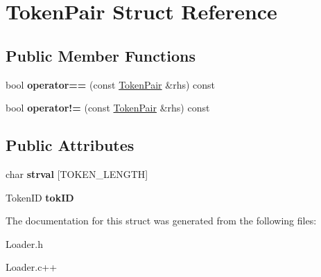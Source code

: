 \hypertarget{structTokenPair}{\section{Token\-Pair Struct Reference}
\label{structTokenPair}
}
\subsection*{Public Member Functions}
\begin{DoxyCompactItemize}
\item 
\hypertarget{structTokenPair_aa945304b4393a2ea9380c248318b87ce}{bool {\bfseries operator==} (const \hyperlink{structTokenPair}{Token\-Pair} \&rhs) const }\label{structTokenPair_aa945304b4393a2ea9380c248318b87ce}

\item 
\hypertarget{structTokenPair_ab1f679211334843c340a7b3cada94c43}{bool {\bfseries operator!=} (const \hyperlink{structTokenPair}{Token\-Pair} \&rhs) const }\label{structTokenPair_ab1f679211334843c340a7b3cada94c43}

\end{DoxyCompactItemize}
\subsection*{Public Attributes}
\begin{DoxyCompactItemize}
\item 
\hypertarget{structTokenPair_ad3b8d42ea89e037fe3345d56101a9761}{char {\bfseries strval} \mbox{[}T\-O\-K\-E\-N\-\_\-\-L\-E\-N\-G\-T\-H\mbox{]}}\label{structTokenPair_ad3b8d42ea89e037fe3345d56101a9761}

\item 
\hypertarget{structTokenPair_a4aecfc0a6b10b8cf52c73a1958863f1c}{Token\-I\-D {\bfseries tok\-I\-D}}\label{structTokenPair_a4aecfc0a6b10b8cf52c73a1958863f1c}

\end{DoxyCompactItemize}


The documentation for this struct was generated from the following files\-:\begin{DoxyCompactItemize}
\item 
Loader.\-h\item 
Loader.\-c++\end{DoxyCompactItemize}
